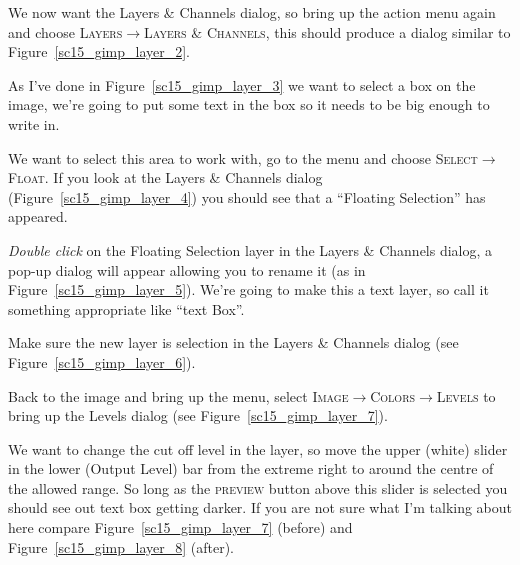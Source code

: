 \documentclass[twoside,11pt]{starlink}
\begin{document}
We now want the Layers \& Channels dialog, so bring up the action menu
again and choose \textsc{Layers}$\rightarrow$\textsc{Layers \& Channels},
this should produce a dialog similar to
Figure~\ref{sc15_gimp_layer_2}.


As I've done in Figure~\ref{sc15_gimp_layer_3} we want to select a box
on the image, we're going to put some text in the box so it needs to
be big enough to write in.


We want to select this area to work with, go to the menu and choose
\textsc{Select}$\rightarrow$\textsc{Float}. If you look at the Layers \&
Channels dialog (Figure~\ref{sc15_gimp_layer_4}) you should see that a
``Floating Selection'' has appeared.


\emph{Double click} on the Floating Selection layer in the Layers \&
Channels dialog, a pop-up dialog will appear allowing you to rename it
(as in Figure~\ref{sc15_gimp_layer_5}). We're going to make this a
text layer, so call it something appropriate like ``text Box''.


Make sure the new layer is selection in the Layers \& Channels dialog
(see Figure~\ref{sc15_gimp_layer_6}).


Back to the image and bring up the menu, select \textsc{Image}$\rightarrow$\textsc{Colors}$\rightarrow$\textsc{Levels} to bring up
the Levels dialog (see Figure~\ref{sc15_gimp_layer_7}).


We want to change the cut off level in the layer, so move the upper
(white) slider in the lower (Output Level) bar from the extreme right
to around the centre of the allowed range. So long as the \textsc{preview} button above this slider is selected you should see out text
box getting darker. If you are not sure what I'm talking about here
compare Figure~\ref{sc15_gimp_layer_7} (before) and
Figure~\ref{sc15_gimp_layer_8} (after).
\end{document}
